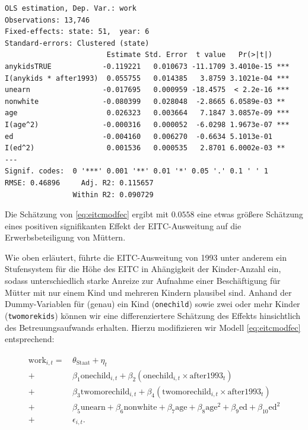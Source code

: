 \documentclass[
  a4paper,
  DIV=11,
  oneside]{scrreprt}
\begin{document}
\begin{verbatim}
OLS estimation, Dep. Var.: work
Observations: 13,746
Fixed-effects: state: 51,  year: 6
Standard-errors: Clustered (state) 
                        Estimate Std. Error  t value   Pr(>|t|)    
anykidsTRUE            -0.119221   0.010673 -11.1709 3.4010e-15 ***
I(anykids * after1993)  0.055755   0.014385   3.8759 3.1021e-04 ***
unearn                 -0.017695   0.000959 -18.4575  < 2.2e-16 ***
nonwhite               -0.080399   0.028048  -2.8665 6.0589e-03 ** 
age                     0.026323   0.003664   7.1847 3.0857e-09 ***
I(age^2)               -0.000316   0.000052  -6.0298 1.9673e-07 ***
ed                     -0.004160   0.006270  -0.6634 5.1013e-01    
I(ed^2)                 0.001536   0.000535   2.8701 6.0002e-03 ** 
---
Signif. codes:  0 '***' 0.001 '**' 0.01 '*' 0.05 '.' 0.1 ' ' 1
RMSE: 0.46896     Adj. R2: 0.115657
                Within R2: 0.090729
\end{verbatim}

Die Schätzung von \eqref{eq:eitcmodfec} ergibt mit \(0.0558\) eine etwas
größere Schätzung eines positiven signifikanten Effekt der
EITC-Ausweitung auf die Erwerbsbeteiligung von Müttern.

Wie oben erläutert, führte die EITC-Ausweitung von 1993 unter anderem
ein Stufensystem für die Höhe des EITC in Ahängigkeit der Kinder-Anzahl
ein, sodass unterschiedlich starke Anreize zur Aufnahme einer
Beschäftigung für Mütter mit nur einem Kind und mehreren Kindern
plausibel sind. Anhand der Dummy-Variablen für (genau) ein Kind
(\texttt{onechild}) sowie zwei oder mehr Kinder (\texttt{twomorekids})
können wir eine differenziertere Schätzung des Effekts hinsichtlich des
Betreuungsaufwands erhalten. Hierzu modifizieren wir Modell
\eqref{eq:eitcmodfec} entsprechend:

\begin{align}
  \begin{split}
    \text{work}_{i,t} =&\, \theta_\text{Staat} + \eta_t \\
    +&\, \beta_1 \text{onechild}_{i,t} + \beta_2 (\text{onechild}_{i,t} \times \text{after1993}_t) \\
    +&\, \beta_3 \text{twomorechild}_{i,t} + \beta_4 (\text{twomorechild}_{i,t} \times \text{after1993}_t) \\
    +&\, \beta_5 \text{unearn} + \beta_6 \text{nonwhite} + \beta_7 \text{age} + \beta_8 \text{age}^2 + \beta_9 \text{ed} + \beta_{10} \text{ed}^2 \\
    +&\, \epsilon_{i,t}.
  \end{split}\label{eq:eitcmodfecd}
\end{align}
\end{document}
